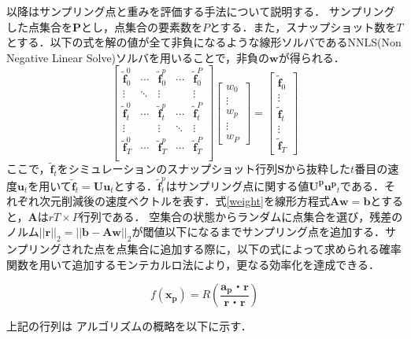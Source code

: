 \documentclass[a4j,12pt]{jreport}
\begin{document}
以降はサンプリング点と重みを評価する手法について説明する．
サンプリングした点集合を$\bm{P}$とし，点集合の要素数を$P$とする．また，スナップショット数を$T$とする．以下の式を解の値が全て非負になるような線形ソルバであるNNLS(Non Negative Linear Solve)ソルバを用いることで，非負の$\bm{w}$が得られる．
\begin{equation}\label{weight}
	 \begin{bmatrix}
	 \bm{\tilde{f}}^0_0	&\cdots	&\bm{\tilde{f}}^p_0	&\cdots	&\bm{\tilde{f}}^P_0\\
		\vdots		&\ddots		&\vdots		&		&\vdots			\\
	\bm{\tilde{f}}^0_t	&\cdots	&\bm{\tilde{f}}^p_t	&\cdots	&\bm{\tilde{f}}^P_t\\
		\vdots		&		&\vdots			&\ddots		&\vdots			\\
	\bm{\tilde{f}}^0_T	&\cdots	&\bm{\tilde{f}}^p_T	&\cdots	&\bm{\tilde{f}}^P_T\\
	\end{bmatrix}
	\begin{bmatrix}
	w_0 	\\
	\vdots \\
	w_p \\
	\vdots \\
	w_P
	\end{bmatrix}=
	\begin{bmatrix}
	\bm{\tilde{f}}_0 	\\
	\vdots \\
	\bm{\tilde{f}}_t \\
	\vdots \\
	\bm{\tilde{f}}_T
	\end{bmatrix}
\end{equation}
ここで，$\bm{\tilde{f}}_t $をシミュレーションのスナップショット行列$\bm{S}$から抜粋した$t$番目の速度$\bm{u}_t$を用いて$\bm{\tilde{f}}_t = \bm{U}\bm{u}_t$とする．$\bm{\tilde{f}}^p_t$はサンプリング点に関する値$\bm{U^p}\bm{u^p}_t$である．それぞれ次元削減後の速度ベクトルを表す．式\ref{weight}を線形方程式$\bm{A}\bm{w} = \bm{b}$とすると，$\bm{A}$は$rT\times P$行列である．
空集合の状態からランダムに点集合を選び，残差のノルム$||\bm{r}||_2 = ||\bm{b} - \bm{A}\bm{w}||_2$が閾値以下になるまでサンプリング点を追加する．サンプリングされた点を点集合に追加する際に，以下の式によって求められる確率関数を用いて追加するモンテカルロ法により，更なる効率化を達成できる．

\[
f(\bm{x_p}) = R(\frac{\bm{a_p}・\bm{r}}{\bm{r}・\bm{r}})
\]

上記の行列は
アルゴリズムの概略を以下に示す．
\end{document}
